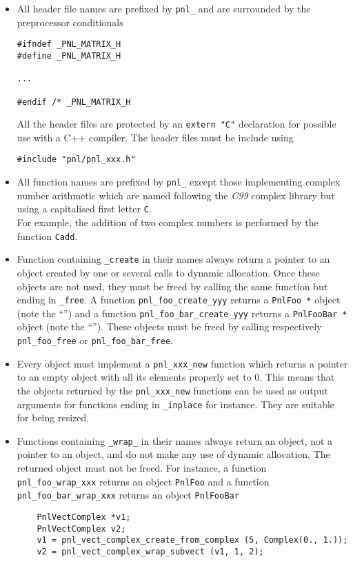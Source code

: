 \documentclass[a4paper,11pt,twoside]{article}
\newcommand{\ptr}{\textasteriskcentered}
\begin{document}
\begin{itemize}
  \item All header file names are prefixed by \verb!pnl_! and are surrounded by
    the preprocessor conditionals
\begin{verbatim}
#ifndef _PNL_MATRIX_H
#define _PNL_MATRIX_H

...

#endif /* _PNL_MATRIX_H
\end{verbatim}
All the header files are protected by an \verb!extern "C"! declaration for
possible use with a C++ compiler. The header files must be include using
\begin{verbatim}
#include "pnl/pnl_xxx.h"
\end{verbatim}

  \item All function names are prefixed by \verb!pnl_! except those implementing
    complex number arithmetic which are named following the \textit{C99}
    complex library but using a capitalised first letter \verb!C!. \\
    For example, the addition of two complex numbers is performed by the
    function \verb!Cadd!.

  \item Function containing \verb!_create! in their names always return a
    pointer to an object created by one or several calls to dynamic
    allocation. Once these objects are not used, they must be freed by calling
    the same function but ending in \verb!_free!.
    A function \verb!pnl_foo_create_yyy! returns a \verb!PnlFoo *! object (note
    the ``\ptr'') and a function \verb!pnl_foo_bar_create_yyy! returns a
    \verb!PnlFooBar *! object (note the ``\ptr'').
    These objects must be freed by calling respectively \verb!pnl_foo_free! or
    \verb!pnl_foo_bar_free!.
    
  \item Every object must implement a \verb!pnl_xxx_new! function which returns
    a pointer to an empty object with all its elements properly set to $0$. This
    means that the objects returned by the \verb!pnl_xxx_new! functions can be
    used as output arguments for functions ending in \verb!_inplace! for
    instance. They are suitable for being resized. 

  \item Functions containing \verb!_wrap_! in their names always return an
    object, not a pointer to an object, and do not make any use of dynamic
    allocation. The returned object must not be freed. 
    For instance, a function \verb!pnl_foo_wrap_xxx! returns an object
    \verb!PnlFoo! and a function \verb!pnl_foo_bar_wrap_xxx! returns an object
    \verb!PnlFooBar! 
    \begin{verbatim}
    PnlVectComplex *v1;
    PnlVectComplex v2;
    v1 = pnl_vect_complex_create_from_complex (5, Complex(0., 1.));
    v2 = pnl_vect_complex_wrap_subvect (v1, 1, 2);


\end{verbatim}
\end{itemize}
\end{document}
